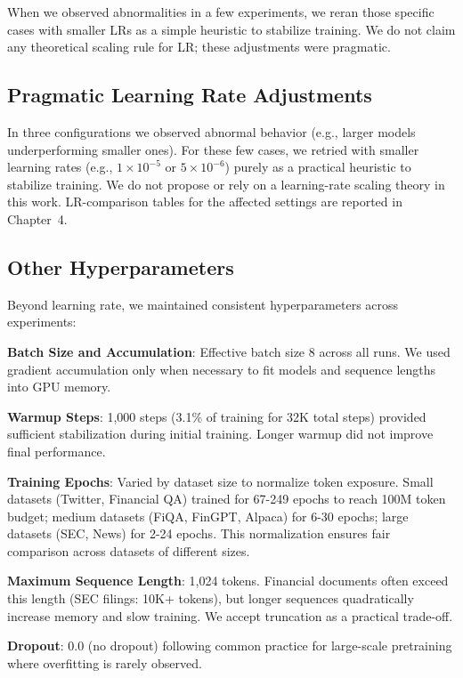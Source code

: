 When we observed abnormalities in a few experiments, we reran those specific cases with smaller LRs as a simple heuristic to stabilize training. We do not claim any theoretical scaling rule for LR; these adjustments were pragmatic.

\subsection{Pragmatic Learning Rate Adjustments}

In three configurations we observed abnormal behavior (e.g., larger models underperforming smaller ones). For these few cases, we retried with smaller learning rates (e.g., $1\times 10^{-5}$ or $5\times 10^{-6}$) purely as a practical heuristic to stabilize training. We do not propose or rely on a learning-rate scaling theory in this work. LR-comparison tables for the affected settings are reported in Chapter~4.

\subsection{Other Hyperparameters}

Beyond learning rate, we maintained consistent hyperparameters across experiments:

\textbf{Batch Size and Accumulation}: Effective batch size 8 across all runs. We used gradient accumulation only when necessary to fit models and sequence lengths into GPU memory.

\textbf{Warmup Steps}: 1,000 steps (3.1\% of training for 32K total steps) provided sufficient stabilization during initial training. Longer warmup did not improve final performance.

\textbf{Training Epochs}: Varied by dataset size to normalize token exposure. Small datasets (Twitter, Financial QA) trained for 67-249 epochs to reach 100M token budget; medium datasets (FiQA, FinGPT, Alpaca) for 6-30 epochs; large datasets (SEC, News) for 2-24 epochs. This normalization ensures fair comparison across datasets of different sizes.

\textbf{Maximum Sequence Length}: 1,024 tokens. Financial documents often exceed this length (SEC filings: 10K+ tokens), but longer sequences quadratically increase memory and slow training. We accept truncation as a practical trade-off.

\textbf{Dropout}: 0.0 (no dropout) following common practice for large-scale pretraining where overfitting is rarely observed.

